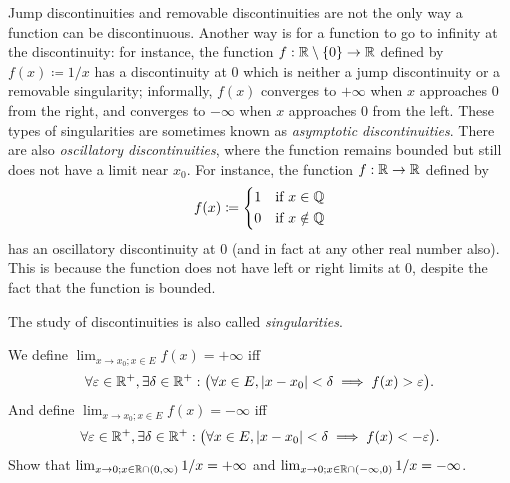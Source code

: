 \begin{rmk}\label{9.5.4}
  Jump discontinuities and removable discontinuities are not the only way a function can be discontinuous.
  Another way is for a function to go to infinity at the discontinuity:
  for instance, the function \(f : \mathbb{R} \setminus \left\lbrace0\right\rbrace \to \mathbb{R}\) defined by \(f(x) \coloneqq 1 / x\) has a discontinuity at \(0\) which is neither a jump discontinuity or a removable singularity;
  informally, \(f(x)\) converges to \(+\infty\) when \(x\) approaches \(0\) from the right, and converges to \(-\infty\) when \(x\) approaches \(0\) from the left.
  These types of singularities are sometimes known as \emph{asymptotic discontinuities}.
  There are also \emph{oscillatory discontinuities}, where the function remains bounded but still does not have a limit near \(x_0\).
  For instance, the function \(f : \mathbb{R} \to \mathbb{R}\) defined by
  \[
    f(x) \coloneqq \begin{dcases}
      1 & \text{if } x \in \mathbb{Q}    \\
      0 & \text{if } x \notin \mathbb{Q}
    \end{dcases}
  \]
  has an oscillatory discontinuity at \(0\) (and in fact at any other real number also).
  This is because the function does not have left or right limits at \(0\), despite the fact that the function is bounded.
\end{rmk}

\begin{note}
  The study of discontinuities is also called \emph{singularities}.
\end{note}

\begin{ac}\label{ac:9.5.2}
  We define \(\lim_{x \to x_0 ; x \in E} f(x) = +\infty\) iff
  \[
    \forall \varepsilon \in \mathbb{R}^+, \exists \delta \in \mathbb{R}^+ : \big(\forall x \in E, \left\lvert x - x_0\right\rvert < \delta \implies f(x) > \varepsilon\big).
  \]
  And define \(\lim_{x \to x_0 ; x \in E} f(x) = -\infty\) iff
  \[
    \forall \varepsilon \in \mathbb{R}^+, \exists \delta \in \mathbb{R}^+ : \big(\forall x \in E, \left\lvert x - x_0\right\rvert < \delta \implies f(x) < -\varepsilon\big).
  \]
  Show that \(\lim_{x \to 0 ; x \in \mathbb{R} \cap (0, \infty)} 1 / x = +\infty\) and \(\lim_{x \to 0 ; x \in \mathbb{R} \cap (-\infty, 0)} 1 / x = -\infty\).
\end{ac}

